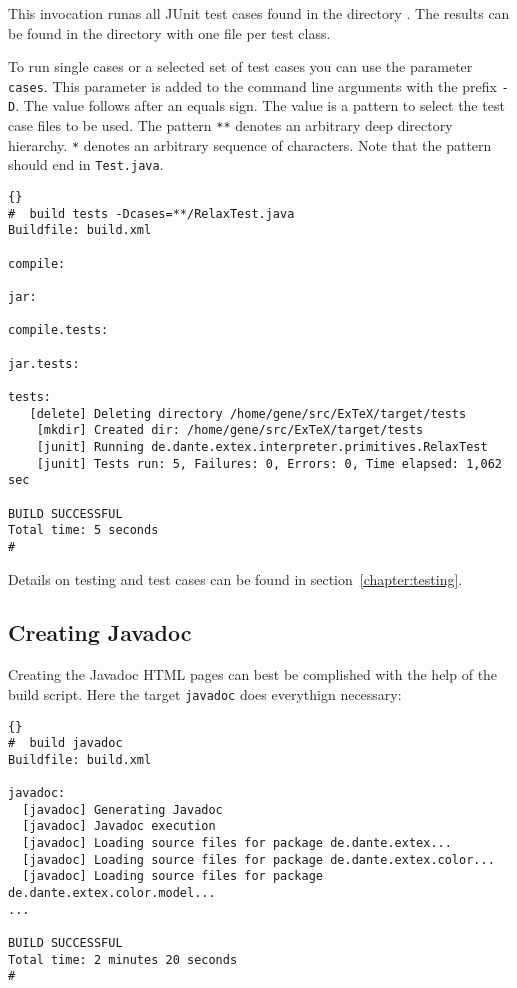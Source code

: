 This invocation runas all JUnit test cases found in the directory
. The results can be found in the directory
 with one file per test class.

To run single cases or a selected set of test cases you can use the
parameter \texttt{cases}. This parameter is added to the command line
arguments with the prefix \verb|-D|. The value follows after an equals
sign. The value is a pattern to select the test case files to be used.
The pattern \verb|**| denotes an arbitrary deep directory hierarchy.
\verb|*| denotes an arbitrary sequence of characters. Note that the
pattern should end in \verb|Test.java|.

\begin{lstlisting}{}
#  build tests -Dcases=**/RelaxTest.java
Buildfile: build.xml

compile:

jar:

compile.tests:

jar.tests:

tests:
   [delete] Deleting directory /home/gene/src/ExTeX/target/tests
    [mkdir] Created dir: /home/gene/src/ExTeX/target/tests
    [junit] Running de.dante.extex.interpreter.primitives.RelaxTest
    [junit] Tests run: 5, Failures: 0, Errors: 0, Time elapsed: 1,062 sec

BUILD SUCCESSFUL
Total time: 5 seconds
#
\end{lstlisting}

Details on testing and test cases can be found in
section~\ref{chapter:testing}.


\subsection{Creating Javadoc}\label{sec:shell-javadoc}

Creating the Javadoc HTML pages can best be complished with the help
of the build script. Here the target \texttt{javadoc} does everythign
necessary:

\begin{lstlisting}{}
#  build javadoc
Buildfile: build.xml

javadoc:
  [javadoc] Generating Javadoc
  [javadoc] Javadoc execution
  [javadoc] Loading source files for package de.dante.extex...
  [javadoc] Loading source files for package de.dante.extex.color...
  [javadoc] Loading source files for package de.dante.extex.color.model...
...

BUILD SUCCESSFUL
Total time: 2 minutes 20 seconds
#
\end{lstlisting}{}


